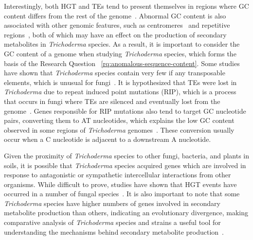 Interestingly, both HGT and TEs tend to present themselves in regions where GC content differs from the rest of the genome~\cite{goncalves2024}. Abnormal GC content is also associated with other genomic features, such as centromeres~\cite{plohl2014a} and repetitive regions~\cite{winter2018}, both of which may have an effect on the production of secondary metabolites in \textit{Trichoderma} species. As a result, it is important to consider the GC content of a genome when studying \textit{Trichoderma} species, which forms the basis of the Research Question ~\ref{rq:anomalous-sequence-content}. Some studies have shown that \textit{Trichoderma} species contain very few if any transposable elements, which is unusual for fungi~\cite{kubicek2011}. It is hypothesized that TEs were lost in \textit{Trichoderma} due to repeat induced point mutations (RIP), which is a process that occurs in fungi where TEs are silenced and eventually lost from the genome~\cite{kubicek2011}. Genes responsible for RIP mutations also tend to target GC nucleotide pairs, converting them to AT nucleotides, which explains the low GC content observed in some regions of \textit{Trichoderma} genomes~\cite{goncalves2024}. These conversion usually occur when a C nucleotide is adjacent to a downstream A nucleotide.


Given the proximity of \textit{Trichoderma} species to other fungi, bacteria, and plants in soils, it is possible that \textit{Trichoderma} species acquired genes which are involved in response to antagonistic or sympathetic intercellular interactions from other organisms. While difficult to prove, studies have shown that HGT events have occurred in a number of fungal species~\cite{fitzpatrick2012}. It is also important to note that some \textit{Trichoderma} species have higher numbers of genes involved in secondary metabolite production than others, indicating an evolutionary divergence, making comparative analysis of \textit{Trichoderma} species and strains a useful tool for understanding the mechanisms behind secondary metabolite production~\cite{Mukherjee2012}.

